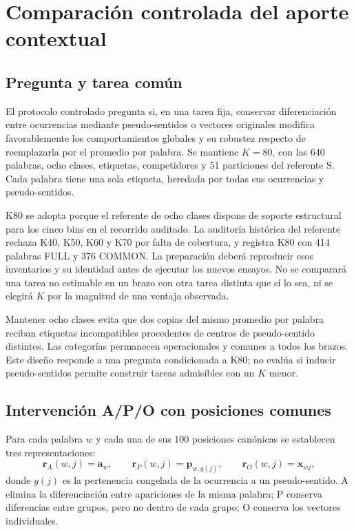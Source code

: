 \section{Comparación controlada del aporte contextual}
\label{sec:met-controlado}

\subsection{Pregunta y tarea común}

El protocolo controlado pregunta si, en una tarea fija, conservar diferenciación entre ocurrencias mediante pseudo-sentidos o vectores originales modifica favorablemente los comportamientos globales y su robustez respecto de reemplazarla por el promedio por palabra. Se mantiene $K=80$, con las 640 palabras, ocho clases, etiquetas, competidores y 51 particiones del referente S. Cada palabra tiene una sola etiqueta, heredada por todas sus ocurrencias y pseudo-sentidos.

K80 se adopta porque el referente de ocho clases dispone de soporte estructural para los cinco bins en el recorrido auditado. La auditoría histórica del referente rechaza K40, K50, K60 y K70 por falta de cobertura, y registra K80 con 414 palabras FULL y 376 COMMON. La preparación deberá reproducir esos inventarios y su identidad antes de ejecutar los nuevos ensayos. No se comparará una tarea no estimable en un brazo con otra tarea distinta que sí lo sea, ni se elegirá $K$ por la magnitud de una ventaja observada.

Mantener ocho clases evita que dos copias del mismo promedio por palabra reciban etiquetas incompatibles procedentes de centros de pseudo-sentido distintos. Las categorías permanecen operacionales y comunes a todos los brazos. Este diseño responde a una pregunta condicionada a K80; no evalúa si inducir pseudo-sentidos permite construir tareas admisibles con un $K$ menor.

\subsection{Intervención A/P/O con posiciones comunes}

Para cada palabra $w$ y cada una de sus 100 posiciones canónicas se establecen tres representaciones:
\begin{equation}
\mathbf r_A(w,j)=\mathbf a_w,\qquad
\mathbf r_P(w,j)=\mathbf p_{w,g(j)},\qquad
\mathbf r_O(w,j)=\mathbf x_{wj},
\label{eq:met-intervencion}
\end{equation}
donde $g(j)$ es la pertenencia congelada de la ocurrencia a un pseudo-sentido. A elimina la diferenciación entre apariciones de la misma palabra; P conserva diferencias entre grupos, pero no dentro de cada grupo; O conserva los vectores individuales.

